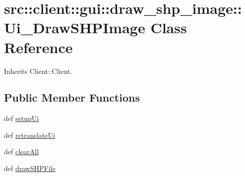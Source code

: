 \hypertarget{classsrc_1_1client_1_1gui_1_1draw__shp__image_1_1Ui__DrawSHPImage}{
\section{src::client::gui::draw\_\-shp\_\-image::Ui\_\-DrawSHPImage Class Reference}
\label{classsrc_1_1client_1_1gui_1_1draw__shp__image_1_1Ui__DrawSHPImage}
}


Inherits Client::Client.

\subsection*{Public Member Functions}
\begin{DoxyCompactItemize}
\item 
def \hyperlink{classsrc_1_1client_1_1gui_1_1draw__shp__image_1_1Ui__DrawSHPImage_aadd063e3e5480615a2f1a23ad1b8b2d8}{setupUi}
\item 
def \hyperlink{classsrc_1_1client_1_1gui_1_1draw__shp__image_1_1Ui__DrawSHPImage_af2b1a4e4aa065580cd1406e2a06ad39e}{retranslateUi}
\item 
def \hyperlink{classsrc_1_1client_1_1gui_1_1draw__shp__image_1_1Ui__DrawSHPImage_a82815e73e630652959184a3d45d26cef}{clearAll}
\item 
def \hyperlink{classsrc_1_1client_1_1gui_1_1draw__shp__image_1_1Ui__DrawSHPImage_a9f1b5fbf0749b1d93aa4ef62733655b7}{drawSHPFile}
\end{DoxyCompactItemize}
